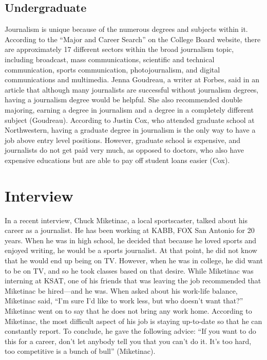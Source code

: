     \subsection{Undergraduate}
Journalism is unique because of the numerous degrees and subjects within it. According to the “Major and Career Search” on the College Board website, there are approximately 17 different sectors within the broad journalism topic, including broadcast, mass communications, scientific and technical communication, sports communication, photojournalism, and digital communications and multimedia. Jenna Goudreau, a writer at Forbes, said in an article that although many journalists are successful without journalism degrees, having a journalism degree would be helpful. She also recommended double majoring, earning a degree in journalism and a degree in a completely different subject (Goudreau). According to Justin Cox, who attended graduate school at Northwestern, having a graduate degree in journalism is the only way to have a job above entry level positions. However, graduate school is expensive, and journalists do not get paid very much, as opposed to doctors, who also have expensive educations but are able to pay off student loans easier (Cox). 
\section{Interview}
    In a recent interview, Chuck Miketinac, a local sportscaster, talked about his career as a journalist. He has been working at KABB, FOX San Antonio for 20 years. When he was in high school, he decided that because he loved sports and enjoyed writing, he would be a sports journalist. At that point, he did not know that he would end up being on TV. However, when he was in college, he did want to be on TV, and so he took classes based on that desire. While Miketinac was interning at KSAT, one of his friends that was leaving the job recommended that Miketinac be hired—and he was. When asked about his work-life balance, Miketinac said, “I'm sure I'd like to work less, but who doesn't want that?” Miketinac went on to say that he does not bring any work home. According to Miketinac, the most difficult aspect of his job is staying up-to-date so that he can constantly report. To conclude, he gave the following advice: “If you want to do this for a career, don't let anybody tell you that you can't do it. It's too hard, too competitive is a bunch of bull” (Miketinac).
